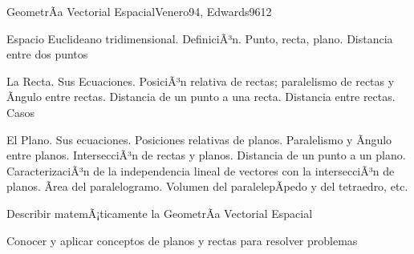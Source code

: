 \begin{syllabus}
\begin{unit}{GeometrÃ­a Vectorial Espacial}{Venero94, Edwards96}{12}
\begin{topics}
      \item Espacio Euclideano tridimensional. DefiniciÃ³n. Punto, recta, plano. Distancia entre dos puntos
      \item La Recta. Sus Ecuaciones. PosiciÃ³n relativa de rectas; paralelismo de rectas y Ãngulo entre rectas. Distancia de un punto a una recta. Distancia entre rectas. Casos
      \item El Plano. Sus ecuaciones. Posiciones relativas de planos. Paralelismo y Ãngulo entre planos. IntersecciÃ³n de rectas y planos. Distancia de un punto a un plano. CaracterizaciÃ³n de la independencia lineal de  vectores con la intersecciÃ³n de planos. Ãrea del paralelogramo. Volumen del paralelepÃ­pedo y del tetraedro, etc.
	\end{topics}

   \begin{unitgoals}
      \item Describir matemÃ¡ticamente la GeometrÃ­a Vectorial Espacial
      \item Conocer y aplicar conceptos de planos y rectas para resolver problemas
   \end{unitgoals}
\end{unit}


\end{syllabus}
